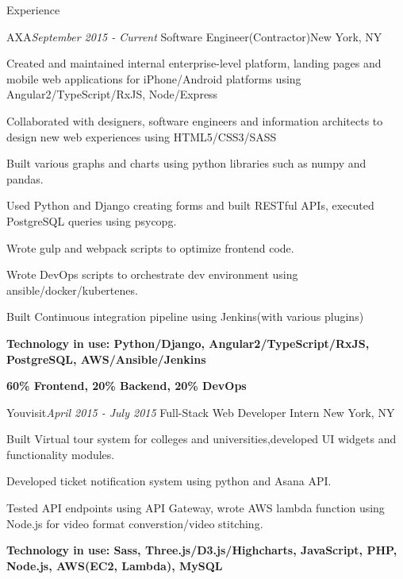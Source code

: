 \documentclass{resume} %
\begin{document}
\begin{rSection}{Experience}
\begin{rSubsection}{AXA}{\em September 2015 - Current }{Software Engineer(Contractor)}{New York, NY}
\item Created and maintained internal enterprise-level platform, landing pages and mobile web applications for iPhone/Android platforms using Angular2/TypeScript/RxJS, Node/Express
\item Collaborated with designers, software engineers and information architects to design new web experiences using HTML5/CSS3/SASS
\item Built various graphs and charts using python libraries such as numpy and pandas.
\item Used Python and Django creating forms and built RESTful APIs, executed PostgreSQL queries using psycopg.
\item Wrote gulp and webpack scripts to optimize frontend code.
\item Wrote DevOps scripts to orchestrate dev environment using ansible/docker/kubertenes.
\item Built Continuous integration pipeline using Jenkins(with various plugins)
\item {\bf Technology in use: Python/Django, Angular2/TypeScript/RxJS, PostgreSQL, AWS/Ansible/Jenkins }
\item {\bf 60\% Frontend, 20\% Backend, 20\% DevOps }

\end{rSubsection}

\begin{rSubsection}{Youvisit}{\em April 2015 - July 2015 }{Full-Stack Web Developer Intern}{ New York, NY}
\item Built Virtual tour system for colleges and universities,developed UI widgets and functionality modules.
\item Developed ticket notification system using python and Asana API.
\item Tested API endpoints using API Gateway, wrote AWS lambda function using Node.js for video format converstion/video stitching.
\item {\bf Technology in use: Sass, Three.js/D3.js/Highcharts, JavaScript, PHP, Node.js, AWS(EC2, Lambda), MySQL}


\end{rSubsection}
\end{rSection}
\end{document}
